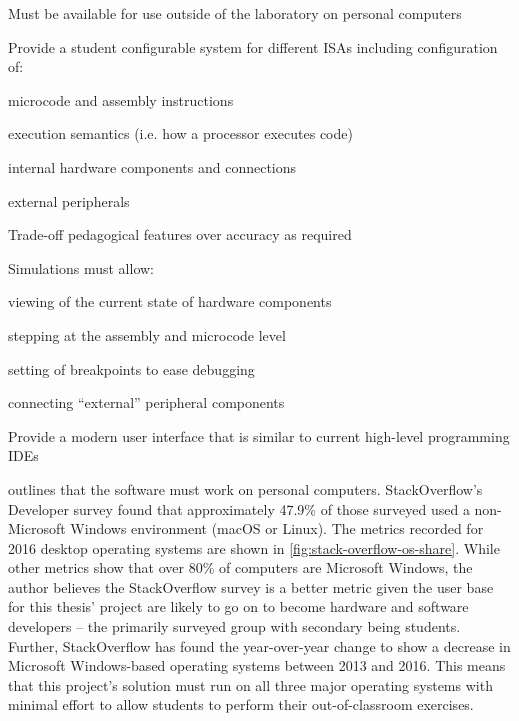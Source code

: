 \begin{requirements}
    \item\label{req:personal} Must be available for use outside of the laboratory on personal computers
        
    \item\label{req:configuration} Provide a student configurable system for different ISAs including configuration of:
        \begin{requirements}
            \item microcode and assembly instructions
            \item execution semantics (i.e. how a processor executes code)
            \item internal hardware components and connections
            \item external peripherals
        \end{requirements}
        
    \item\label{req:pedagogical} Trade-off pedagogical features over accuracy as required
       
    \item\label{req:simulations} Simulations must allow: 
        \begin{requirements}
            \item viewing of the current state of hardware components
            \item stepping at the assembly and microcode level
            \item setting of breakpoints to ease debugging
            \item connecting ``external'' peripheral components
        \end{requirements}
    
    \item \label{req:modern} Provide a modern user interface that is similar to current high-level programming IDEs
        
\end{requirements}

 outlines that the software must work on personal computers. StackOverflow's Developer survey \cite{StackOverflowSurvey2016} found that approximately 47.9\% of those surveyed used a non-Microsoft Windows environment (macOS or Linux). The metrics recorded for 2016 desktop operating systems are shown in \cref{fig:stack-overflow-os-share}. While other metrics show that over 80\% of computers are Microsoft Windows\cite{StatCounter2017}, the author believes the StackOverflow survey is a better metric given the user base for this thesis' project are likely to go on to become hardware and software developers -- the primarily surveyed group with secondary being students\cite[Sec.~II.~Developer~Profiles]{StackOverflowSurvey2016}. Further, StackOverflow has found the year-over-year change to show a decrease in Microsoft Windows-based operating systems between 2013 and 2016\cite{StackOverflowSurvey2016}. This means that this project's solution must run on all three major operating systems with minimal effort to allow students to perform their out-of-classroom exercises. 

